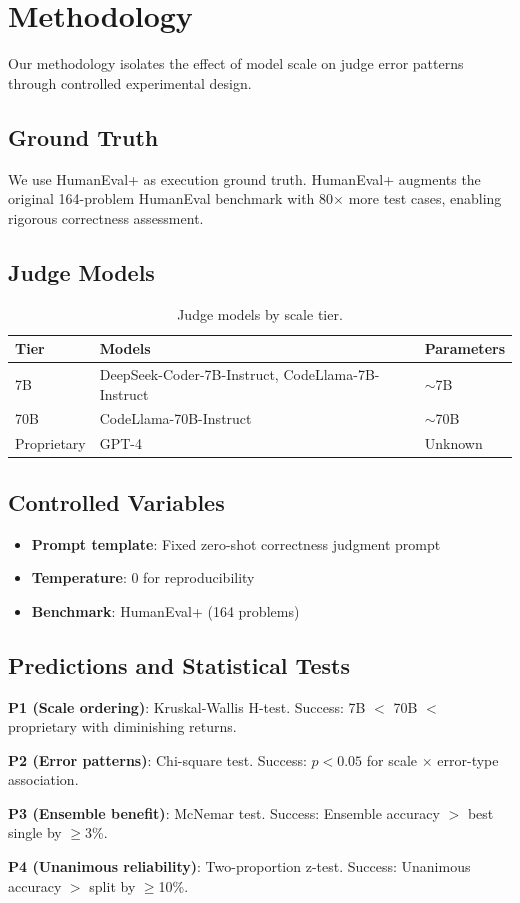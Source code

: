 \section{Methodology}

Our methodology isolates the effect of model scale on judge error patterns through controlled experimental design.

\subsection{Ground Truth}

We use HumanEval+ \cite{liu2023evalplus} as execution ground truth. HumanEval+ augments the original 164-problem HumanEval benchmark with 80$\times$ more test cases, enabling rigorous correctness assessment.

\subsection{Judge Models}

\begin{table}[h]
\centering
\begin{tabular}{@{}lll@{}}
\toprule
Tier & Models & Parameters \\
\midrule
7B & DeepSeek-Coder-7B-Instruct, CodeLlama-7B-Instruct & $\sim$7B \\
70B & CodeLlama-70B-Instruct & $\sim$70B \\
Proprietary & GPT-4 & Unknown \\
\bottomrule
\end{tabular}
\caption{Judge models by scale tier.}
\label{tab:models}
\end{table}

\subsection{Controlled Variables}

\begin{itemize}
    \item \textbf{Prompt template}: Fixed zero-shot correctness judgment prompt
    \item \textbf{Temperature}: 0 for reproducibility
    \item \textbf{Benchmark}: HumanEval+ (164 problems)
\end{itemize}

\subsection{Predictions and Statistical Tests}

\textbf{P1 (Scale ordering)}: Kruskal-Wallis H-test. Success: 7B $<$ 70B $<$ proprietary with diminishing returns.

\textbf{P2 (Error patterns)}: Chi-square test. Success: $p < 0.05$ for scale $\times$ error-type association.

\textbf{P3 (Ensemble benefit)}: McNemar test. Success: Ensemble accuracy $>$ best single by $\geq$3\%.

\textbf{P4 (Unanimous reliability)}: Two-proportion z-test. Success: Unanimous accuracy $>$ split by $\geq$10\%.

